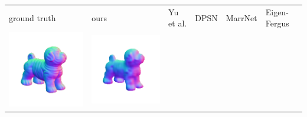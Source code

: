 \begin{tabularx}{\linewidth}{@{}Y@{}Y@{}Y@{}Y@{}Y@{}Y@{}}
ground truth & ours & Yu et al. & DPSN & MarrNet & Eigen-Fergus \\
\includegraphics[width=\linewidth]{semisynthetic/20150514_17_gt.png} &
\includegraphics[width=\linewidth]{semisynthetic/20150514_17_ours_out.png} &

\end{tabularx}
